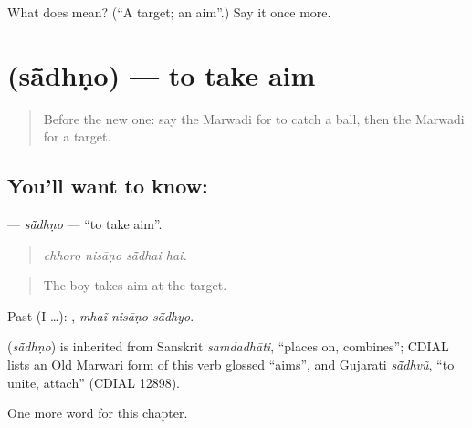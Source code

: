 \begin{tcolorbox}[breakable,colback=teal!4,colframe=teal!35!black,title={Before you move on}]
What does  mean? (\textquotedblleft{}A target; an aim\textquotedblright{}.) Say it once more.
\end{tcolorbox}
\section[\texorpdfstring{\mw{सांधणो} (sā̃dhṇo)}{सांधणो (sā̃dhṇo)}]{ (sā̃dhṇo) — to take aim}

\label{lesson:MW-C280-sadhno}



\begin{quote}
Before the new one: say the Marwadi for to catch a ball, then the Marwadi for a target.
\end{quote}

\subsection*{You'll want to know: }
\textbf{} — \emph{sā̃dhṇo} — \textquotedblleft{}to take aim\textquotedblright{}.

\begin{quote}
   
\end{quote}

\begin{quote}
\emph{chhoro nisāṇo sā̃dhai hai.}
\end{quote}

\begin{quote}
The boy takes aim at the target.
\end{quote}

Past (I …):   , \emph{mhaĩ nisāṇo sā̃dhyo}.

\begin{cousinweb}
\textbf{} (\emph{sā̃dhṇo}) is inherited from Sanskrit \emph{samdadhāti}, \textquotedblleft{}places on, combines\textquotedblright{}; CDIAL lists an Old Marwari form of this verb glossed \textquotedblleft{}aims\textquotedblright{}, and Gujarati \emph{sā̃dhvũ}, \textquotedblleft{}to unite, attach\textquotedblright{} (CDIAL 12898).
\end{cousinweb}

\begin{grammarlens}[title={What you've built}]
One more word for this chapter.
\end{grammarlens}

